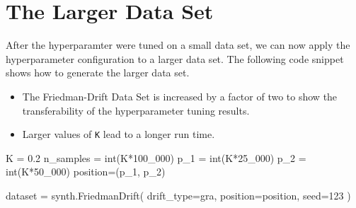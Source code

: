\documentclass[
  letterpaper,
  DIV=11,
  numbers=noendperiod]{scrreprt}
\newenvironment{Shaded}{\begin{snugshade}}{\end{snugshade}}
\newcommand{\BuiltInTok}[1]{\textcolor[rgb]{0.00,0.23,0.31}{#1}}
\newcommand{\DecValTok}[1]{\textcolor[rgb]{0.68,0.00,0.00}{#1}}
\newcommand{\FloatTok}[1]{\textcolor[rgb]{0.68,0.00,0.00}{#1}}
\newcommand{\NormalTok}[1]{\textcolor[rgb]{0.00,0.23,0.31}{#1}}
\newcommand{\OperatorTok}[1]{\textcolor[rgb]{0.37,0.37,0.37}{#1}}
\newcommand{\StringTok}[1]{\textcolor[rgb]{0.13,0.47,0.30}{#1}}
\providecommand{\tightlist}{%
  \setlength{\itemsep}{0pt}\setlength{\parskip}{0pt}}\usepackage{longtable,booktabs,array}
\begin{document}
\hypertarget{the-larger-data-set}{%
\section{The Larger Data Set}\label{the-larger-data-set}}

After the hyperparamter were tuned on a small data set, we can now apply
the hyperparameter configuration to a larger data set. The following
code snippet shows how to generate the larger data set.

\begin{tcolorbox}[enhanced jigsaw, rightrule=.15mm, opacityback=0, colframe=quarto-callout-caution-color-frame, opacitybacktitle=0.6, toptitle=1mm, arc=.35mm, colbacktitle=quarto-callout-caution-color!10!white, coltitle=black, toprule=.15mm, leftrule=.75mm, titlerule=0mm, title=\textcolor{quarto-callout-caution-color}{\faFire}\hspace{0.5em}{Caution: Increased Friedman-Drift Data Set}, bottomrule=.15mm, breakable, bottomtitle=1mm, left=2mm, colback=white]

\begin{itemize}
\tightlist
\item
  The Friedman-Drift Data Set is increased by a factor of two to show
  the transferability of the hyperparameter tuning results.
\item
  Larger values of \texttt{K} lead to a longer run time.
\end{itemize}

\end{tcolorbox}

\begin{Shaded}
\begin{Highlighting}[]
\NormalTok{K }\OperatorTok{=} \FloatTok{0.2}
\NormalTok{n\_samples }\OperatorTok{=} \BuiltInTok{int}\NormalTok{(K}\OperatorTok{*}\DecValTok{100\_000}\NormalTok{)}
\NormalTok{p\_1 }\OperatorTok{=} \BuiltInTok{int}\NormalTok{(K}\OperatorTok{*}\DecValTok{25\_000}\NormalTok{)}
\NormalTok{p\_2 }\OperatorTok{=} \BuiltInTok{int}\NormalTok{(K}\OperatorTok{*}\DecValTok{50\_000}\NormalTok{)}
\NormalTok{position}\OperatorTok{=}\NormalTok{(p\_1, p\_2)}
\end{Highlighting}
\end{Shaded}

\begin{Shaded}
\begin{Highlighting}[]
\NormalTok{dataset }\OperatorTok{=}\NormalTok{ synth.FriedmanDrift(}
\NormalTok{   drift\_type}\OperatorTok{=}\StringTok{\textquotesingle{}gra\textquotesingle{}}\NormalTok{,}
\NormalTok{   position}\OperatorTok{=}\NormalTok{position,}
\NormalTok{   seed}\OperatorTok{=}\DecValTok{123}
\NormalTok{)}
\end{Highlighting}
\end{Shaded}
\end{document}
